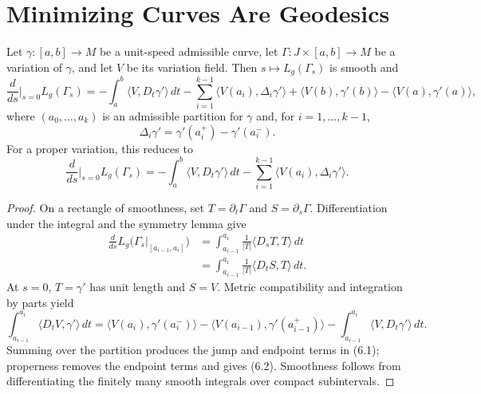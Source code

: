 \section{Minimizing Curves Are Geodesics}

\begin{theorem}
\label{thm:first-variation-formula}


Let $\gamma:[a,b]\to M$ be a unit-speed admissible curve, let
$\Gamma:J\times[a,b]\to M$ be a variation of $\gamma$, and let $V$ be its
variation field.  Then $s\mapsto L_g(\Gamma_s)$ is smooth and
\begin{equation}
\frac{d}{ds}\bigg|_{s=0} L_g(\Gamma_s)
=-\int_a^b\langle V,D_t\gamma'\rangle\,dt
-\sum_{i=1}^{k-1}\langle V(a_i),\Delta_i\gamma'\rangle
+\langle V(b),\gamma'(b)\rangle-\langle V(a),\gamma'(a)\rangle, \tag{6.1}
\end{equation}
where $(a_0,\ldots,a_k)$ is an admissible partition for $\gamma$ and, for
$i=1,\ldots,k-1$,
\[
\Delta_i\gamma'=\gamma'(a_i^+)-\gamma'(a_i^-).
\]
For a proper variation, this reduces to
\begin{equation}
\frac{d}{ds}\bigg|_{s=0} L_g(\Gamma_s)
=-\int_a^b\langle V,D_t\gamma'\rangle\,dt
-\sum_{i=1}^{k-1}\langle V(a_i),\Delta_i\gamma'\rangle. \tag{6.2}
\end{equation}
\end{theorem}

\begin{proof}
\sketch
On a rectangle of smoothness, set
$T=\partial_t\Gamma$ and $S=\partial_s\Gamma$.  Differentiation under the
integral and the symmetry lemma give
\begin{align*}
\frac{d}{ds}L_g\bigl(\Gamma_s|_{[a_{i-1},a_i]}\bigr)
&=\int_{a_{i-1}}^{a_i}\frac{1}{|T|}
\langle D_sT,T\rangle\,dt \\
&=\int_{a_{i-1}}^{a_i}\frac{1}{|T|}
\langle D_tS,T\rangle\,dt. \tag{6.3}
\end{align*}
At $s=0$, $T=\gamma'$ has unit length and $S=V$.  Metric compatibility and
integration by parts yield
\[
\int_{a_{i-1}}^{a_i}\langle D_tV,\gamma'\rangle\,dt
=\langle V(a_i),\gamma'(a_i^-)\rangle
-\langle V(a_{i-1}),\gamma'(a_{i-1}^+)\rangle
-\int_{a_{i-1}}^{a_i}\langle V,D_t\gamma'\rangle\,dt.
\]
Summing over the partition produces the jump and endpoint terms in (6.1);
properness removes the endpoint terms and gives (6.2).  Smoothness follows
from differentiating the finitely many smooth integrals over compact
subintervals.
\end{proof}

